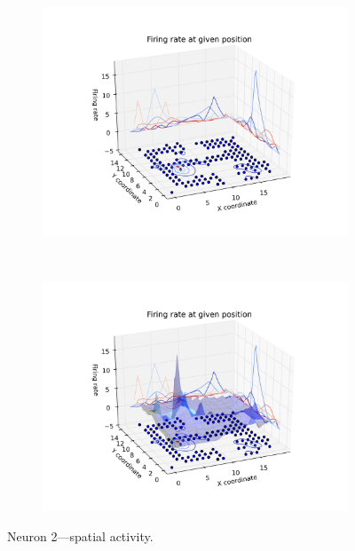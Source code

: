 \documentclass[11pt,a4paper,twocolumn]{article}
\begin{document}
\begin{figure}[htbp]
  \begin{subfigure}{.99\linewidth}\centering
    \includegraphics[width=1.1\textwidth]{figure7_a.png}
    \caption{\label{fig:3d_n2_a}}
  \end{subfigure}\\[1ex]
  \begin{subfigure}{.99\linewidth}\centering
    \includegraphics[width=1.1\textwidth]{figure7_b.png}
    \caption{\label{fig:3d_n2_b}}
  \end{subfigure}

  \caption{Neuron 2---spatial activity.\label{fig:3d_n2}}
\end{figure}
\end{document}
